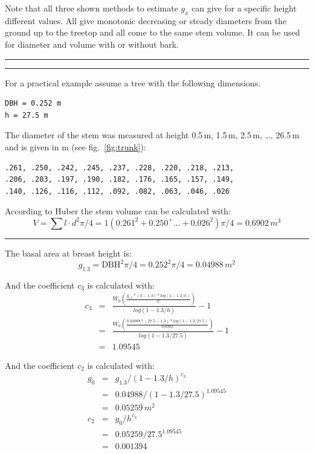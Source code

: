 \documentclass[twocolumn,10pt]{article}
\begin{document}
Note that all three shown methods to estimate $g_x$ can give for a specific
height different values. All give monotonic decreasing or steady diameters from
the ground up to the treetop and all come to the same stem volume. It can be
used for diameter and volume with or without bark.

\par\noindent\rule{\columnwidth}{0.5pt}
\par\noindent\rule{\columnwidth}{0.5pt}

For a practical example assume a tree with the following dimensions.
\begin{verbatim}
DBH = 0.252 m
h = 27.5 m
\end{verbatim}

The diameter of the stem was measured at height 0.5\,m, 1.5\,m, 2.5\,m, \dots,
26.5\,m and is given in m (see fig.~\ref{fig:trunk}):
\begin{verbatim}
.261, .250, .242, .245, .237, .228, .220, .218, .213,
.206, .203, .197, .190, .182, .176, .165, .157, .149,
.140, .126, .116, .112, .092, .082, .063, .046, .026
\end{verbatim}

According to Huber the stem volume can be calculated with:
$$V = \sum l \cdot d^2\pi/4 = 1(0.261^2 + 0.250^ + ... + 0.026^2)\pi/4 = 0.6902\,m^3$$

\par\noindent\rule{\columnwidth}{0.5pt}

The basal area at breast height is:
$$ g_{1.3} = \text{DBH}^2\pi/4 = 0.252^2\pi/4 = 0.04988\,m^2$$

And the coefficient $c_3$ is calculated with:
\begin{eqnarray*}
c_3 & = & \frac{W_0\left(\frac{g_{1.3}*(h-1.3)*log(1-1.3/h)}{V}\right)}{log(1 - 1.3/h)} - 1\\
 & = & \frac{W_0\left(\frac{0.04988*(27.5-1.3)*log(1-1.3/27.5)}{0.6902}\right)}{log(1 - 1.3/27.5)} - 1\\
  & = & 1.09545
\end{eqnarray*}

And the coefficient $c_2$ is calculated with:
\begin{eqnarray*}
g_0 & = & g_{1.3} / (1-1.3/h)^{c_3}\\
 & = & 0.04988 / (1-1.3/27.5)^{1.09545}\\
 & = & 0.05259\,m^2 \\
c_2 & = & g_0 / h^{c_3}\\
 & = & 0.05259 / 27.5^{1.09545}\\
 & = & 0.001394
\end{eqnarray*}
\end{document}
